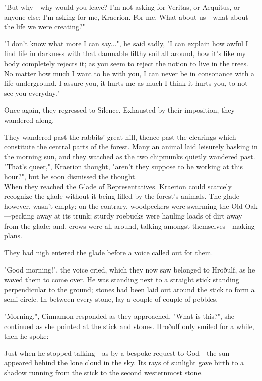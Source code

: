 "But why---why would you leave? I'm not asking for Veritas, or Aequitus, or anyone else; I'm asking for me, Kraerion. For me. What about us---what about the life we were creating?"

"I don't know what more I can say...", he said sadly, "I can explain how awful I find life in darkness with that damnable filthy soil all around, how it's like my body completely rejects it; as you seem to reject the notion to live in the trees. No matter how much I want to be with you, I can never be in consonance with a life underground. I assure you, it hurts me as much I think it hurts you, to not see you everyday."

Once again, they regressed to Silence. Exhausted by their imposition, they wandered along.

They wandered past the rabbits' great hill, thence past the clearings which constitute the central parts of the forest. Many an animal laid leisurely basking in the morning sun, and they watched as the two chipmunks quietly wandered past. "That's queer,", Kraerion thought, "aren't they suppose to be working at this hour?", but he soon dismissed the thought.\\

When they reached the Glade of Representatives. Kraerion could scarcely recognize the glade without it being filled by the forest's animals. The glade however, wasn't empty; on the contrary, woodpeckers were swarming the Old Oak---pecking away at its trunk; sturdy roebucks were hauling loads of dirt away from the glade; and, crows were all around, talking amongst themselves---making plans. 

They had nigh entered the glade before a voice called out for them. 

"Good morning!", the voice cried, which they now saw belonged to Hroðulf, as he waved them to come over. He was standing next to a straight stick standing perpendicular to the ground; stones had been laid out around the stick to form a semi-circle. In between every stone, lay a couple of couple of pebbles.

"Morning,", Cinnamon responded as they approached, "What is this?", she continued as she pointed at the stick and stones. Hroðulf only smiled for a while, then he spoke:



Just when he stopped talking---as by a bespoke request to God---the sun appeared behind the lone cloud in the sky. Its rays of sunlight gave birth to a shadow running from the stick to the second westernmost stone.

